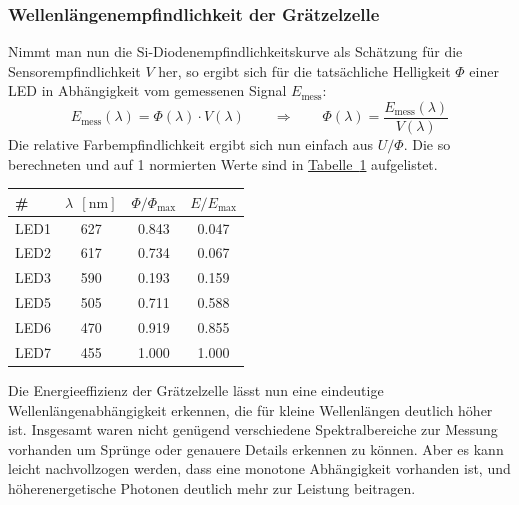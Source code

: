 \documentclass[11pt]{scrartcl}
\newcommand{\unit}[1]{\ensuremath{\,\mathrm{#1}}} %
\begin{document}
\subsubsection{Wellenlängenempfindlichkeit der Grätzelzelle}
Nimmt man nun die Si-Diodenempfindlichkeitskurve als Schätzung für die Sensorempfindlichkeit $V$ her, so ergibt sich für die tatsächliche Helligkeit $\Phi$ einer LED in Abhängigkeit vom gemessenen Signal $E_{\text{mess}}$:
\[
E_{\text{mess}}(\lambda) = \Phi(\lambda)\cdot V(\lambda)
\qquad\Rightarrow\qquad
\Phi(\lambda) = \frac{E_{\text{mess}}(\lambda)}{V(\lambda)}
\]
Die relative Farbempfindlichkeit ergibt sich nun einfach aus $U/\Phi$. Die so berechneten und auf 1 normierten Werte sind in \hyperref[lambda_kurve]{Tabelle~\ref{lambda_kurve}} aufgelistet.
\begin{table}[hc]
\label{lambda_kurve}
\begin{center}\vspace{-\baselineskip}
\begin{tabular}{l|ccc}
\# &
$\lambda\; \unit{[nm]}$ &
$\Phi / \Phi_{\text{max}}$ &
$E/E_{\text{max}}$ \\
\hline
LED1	& 627	& 0.843	& 0.047 \\
LED2	& 617	& 0.734	& 0.067 \\
LED3	& 590	& 0.193	& 0.159 \\
LED5	& 505	& 0.711	& 0.588 \\
LED6	& 470	& 0.919	& 0.855 \\
LED7	& 455	& 1.000	& 1.000
\end{tabular}
\vspace{-\baselineskip}\end{center}
\end{table}
Die Energieeffizienz der Grätzelzelle lässt nun eine eindeutige Wellenlängenabhängigkeit erkennen, die für kleine Wellenlängen deutlich höher ist. Insgesamt waren nicht genügend verschiedene Spektralbereiche zur Messung vorhanden um Sprünge oder genauere Details erkennen zu können. Aber es kann leicht nachvollzogen werden, dass eine monotone Abhängigkeit vorhanden ist, und höherenergetische Photonen deutlich mehr zur Leistung beitragen.
\end{document}
